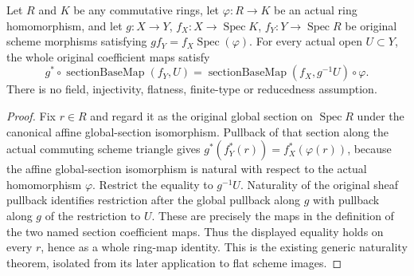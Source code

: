 \begin{lemma}
\label{scheme:actual-section-coefficient-naturality}
\leanok
Let $R$ and $K$ be any commutative rings, let $\varphi:R\to K$ be an
actual ring homomorphism, and let $g:X\to Y$, $f_X:X\to\operatorname{Spec}K$,
$f_Y:Y\to\operatorname{Spec}R$ be original scheme morphisms satisfying
$g f_Y=f_X\operatorname{Spec}(\varphi)$. For every actual open $U\subset Y$,
the whole original coefficient maps satisfy
\[
 g^*\circ\operatorname{sectionBaseMap}(f_Y,U)
 =\operatorname{sectionBaseMap}(f_X,g^{-1}U)\circ\varphi.
\]
There is no field, injectivity, flatness, finite-type or reducedness
assumption.
\end{lemma}
\begin{proof}
Fix $r\in R$ and regard it as the original global section on
$\operatorname{Spec}R$ under the canonical affine global-section
isomorphism. Pullback of that section along the actual commuting scheme
triangle gives
$g^*(f_Y^*(r))=f_X^*(\varphi(r))$, because the affine global-section
isomorphism is natural with respect to the actual homomorphism $\varphi$.
Restrict the equality to $g^{-1}U$. Naturality of the original sheaf
pullback identifies restriction after the global pullback along $g$ with
pullback along $g$ of the restriction to $U$. These are precisely the
maps in the definition of the two named section coefficient maps. Thus
the displayed equality holds on every $r$, hence as a whole ring-map
identity. This is the existing generic naturality theorem, isolated from
its later application to flat scheme images.
\end{proof}
